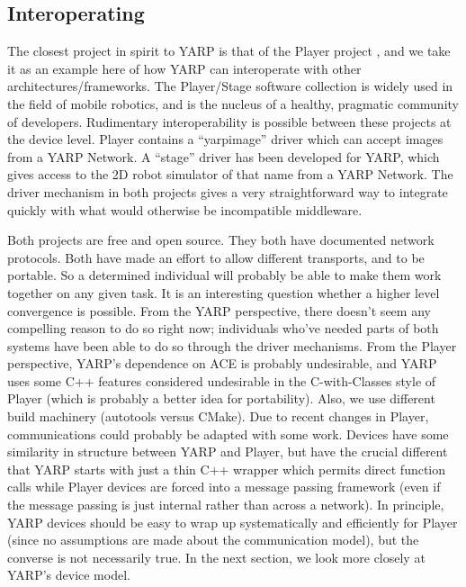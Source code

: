 







\subsection{Interoperating}

The closest project in spirit to YARP is that of the Player project
\cite{vaughan2006reusable}, and we take it as an example here of
how YARP can interoperate with other architectures/frameworks.
The Player/Stage software collection is 
widely used in the field of mobile robotics, and is the nucleus of
a healthy, pragmatic community of developers.  
%
Rudimentary interoperability is possible between these projects
at the device level.
Player contains a ``yarpimage'' driver which can accept images
from a YARP Network.  A ``stage'' driver has been developed
for YARP, which gives access to the 2D robot simulator of that
name from a YARP Network.
%
The driver mechanism in both projects gives a very straightforward way
to integrate quickly with what would otherwise be incompatible
middleware.

Both projects are free and open source.  They both have documented
network protocols.  Both have made an effort to allow different
transports, and to be portable.  So a determined individual
will probably be able to make them work together on any given
task.  It is an interesting question whether a higher level
convergence is possible.
%
%
From the YARP perspective, there doesn't seem any compelling reason to
do so right now; individuals who've needed parts of both systems have
been able to do so through the driver mechanisms.
%
From the Player perspective, YARP's dependence on ACE is probably
undesirable, and YARP uses some C++ features considered
undesirable in the C-with-Classes
style of Player (which is probably a better idea for portability).
Also, we use different build machinery (autotools versus CMake).
%
Due to recent changes in Player, communications could probably be
adapted with some work.  Devices have some similarity in structure
between YARP and Player, but have the crucial different that YARP
starts with just a thin C++ wrapper which permits direct function
calls while Player devices are forced into a message passing framework
(even if the message passing is just internal rather than across a
network).
%
In principle, YARP devices should be easy to wrap up systematically
and efficiently for Player (since no assumptions are made about the
communication model), but the converse is not necessarily true.
%
In the next section, we look more closely at YARP's device model.
%








